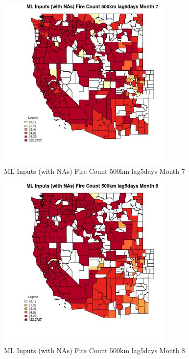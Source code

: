 \begin{figure} 
\centering  
\includegraphics[width=0.77\textwidth]{Code_Outputs/Report_ML_input_PM25_Step4_part_f_de_duplicated_aves_prioritize_24hr_obswNAs_CountyFire_Count_500km_lag5daysmedianMonth7.jpg} 
\caption{\label{fig:Report_ML_input_PM25_Step4_part_f_de_duplicated_aves_prioritize_24hr_obswNAsCountyFire_Count_500km_lag5daysmedianMonth7}ML Inputs (with NAs) Fire Count 500km lag5days Month 7} 
\end{figure} 
 

\begin{figure} 
\centering  
\includegraphics[width=0.77\textwidth]{Code_Outputs/Report_ML_input_PM25_Step4_part_f_de_duplicated_aves_prioritize_24hr_obswNAs_CountyFire_Count_500km_lag5daysmedianMonth8.jpg} 
\caption{\label{fig:Report_ML_input_PM25_Step4_part_f_de_duplicated_aves_prioritize_24hr_obswNAsCountyFire_Count_500km_lag5daysmedianMonth8}ML Inputs (with NAs) Fire Count 500km lag5days Month 8} 
\end{figure} 
 

